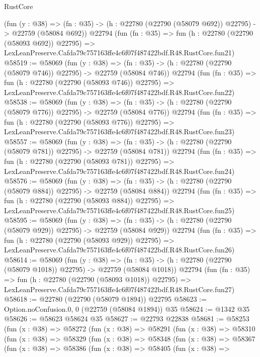 \begin{lexlean}{RustCore}
\begin{coremodule}
    (fun (y : @38) =>
    (fn : @35) -> (h : @22780 (@22790 (@58079 @692)) @22795) -> @22759 (@58084 @692))
    @22794
    (fun (fn : @35) =>
    fun (h : @22780 (@22790 (@58093 @692)) @22795) =>
    LexLeanPreserve.Cafda79c757163ffe4c6f07f487422bdf.R48.RustCore.fun21)
@58519 := @58069
    (fun (y : @38) =>
    (fn : @35) -> (h : @22780 (@22790 (@58079 @746)) @22795) -> @22759 (@58084 @746))
    @22794
    (fun (fn : @35) =>
    fun (h : @22780 (@22790 (@58093 @746)) @22795) =>
    LexLeanPreserve.Cafda79c757163ffe4c6f07f487422bdf.R48.RustCore.fun22)
@58538 := @58069
    (fun (y : @38) =>
    (fn : @35) -> (h : @22780 (@22790 (@58079 @776)) @22795) -> @22759 (@58084 @776))
    @22794
    (fun (fn : @35) =>
    fun (h : @22780 (@22790 (@58093 @776)) @22795) =>
    LexLeanPreserve.Cafda79c757163ffe4c6f07f487422bdf.R48.RustCore.fun23)
@58557 := @58069
    (fun (y : @38) =>
    (fn : @35) -> (h : @22780 (@22790 (@58079 @781)) @22795) -> @22759 (@58084 @781))
    @22794
    (fun (fn : @35) =>
    fun (h : @22780 (@22790 (@58093 @781)) @22795) =>
    LexLeanPreserve.Cafda79c757163ffe4c6f07f487422bdf.R48.RustCore.fun24)
@58576 := @58069
    (fun (y : @38) =>
    (fn : @35) -> (h : @22780 (@22790 (@58079 @884)) @22795) -> @22759 (@58084 @884))
    @22794
    (fun (fn : @35) =>
    fun (h : @22780 (@22790 (@58093 @884)) @22795) =>
    LexLeanPreserve.Cafda79c757163ffe4c6f07f487422bdf.R48.RustCore.fun25)
@58595 := @58069
    (fun (y : @38) =>
    (fn : @35) -> (h : @22780 (@22790 (@58079 @929)) @22795) -> @22759 (@58084 @929))
    @22794
    (fun (fn : @35) =>
    fun (h : @22780 (@22790 (@58093 @929)) @22795) =>
    LexLeanPreserve.Cafda79c757163ffe4c6f07f487422bdf.R48.RustCore.fun26)
@58614 := @58069
    (fun (y : @38) =>
    (fn : @35) -> (h : @22780 (@22790 (@58079 @1018)) @22795) -> @22759 (@58084 @1018))
    @22794
    (fun (fn : @35) =>
    fun (h : @22780 (@22790 (@58093 @1018)) @22795) =>
    LexLeanPreserve.Cafda79c757163ffe4c6f07f487422bdf.R48.RustCore.fun27)
@58618 := @22780 (@22790 (@58079 @1894)) @22795
@58623 := Option.noConfusion.{0, 0} (@22759 (@58084 @1894)) @35
@58624 := @1342 @35
@58626 := @58623 @58624 @35
@58627 := @22793 @22838
@58681 := @58253
    (fun (x : @38) =>
    @58272
      (fun (x : @38) =>
      @58291
        (fun (x : @38) =>
        @58310
          (fun (x : @38) =>
          @58329
            (fun (x : @38) =>
            @58348
              (fun (x : @38) =>
              @58367
                (fun (x : @38) =>
                @58386
                  (fun (x : @38) =>
                  @58405
                    (fun (x : @38) =>

\end{coremodule}
\end{lexlean}

